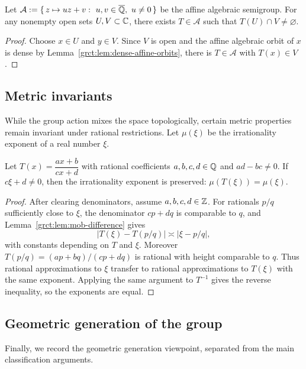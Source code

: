 \begin{corollary}\label{grct:cor:affine-semigroup-transitive}
	Let $\mathcal A:=\{\,z\mapsto uz+v:\ u,v\in\Alg,\ u\ne0\,\}$ be the affine algebraic semigroup. For any nonempty open sets $U,V\subset\mathbb{C}$, there exists $T\in\mathcal A$ such that $T(U)\cap V\neq\varnothing$.
\end{corollary}
\begin{proof}
	Choose $x\in U$ and $y\in V$. Since $V$ is open and the affine algebraic orbit of $x$ is dense by Lemma~\ref{grct:lem:dense-affine-orbits}, there is $T\in\mathcal A$ with $T(x)\in V$.
\end{proof}

\subsection{Metric invariants}

While the group action mixes the space topologically, certain metric properties remain invariant under rational restrictions. Let $\mu(\xi)$ be the irrationality exponent of a real number $\xi$.

\begin{theorem}\label{grct:thm:irr-exp-invariance}
	Let $T(x)=\dfrac{ax+b}{cx+d}$ with rational coefficients $a,b,c,d\in\mathbb{Q}$ and $ad-bc\ne0$. If $c\xi+d\neq 0$, then the irrationality exponent is preserved:
	\(
	\mu(T(\xi))=\mu(\xi).
	\)
\end{theorem}
\begin{proof}
	After clearing denominators, assume $a,b,c,d\in\mathbb{Z}$. For rationals $p/q$ sufficiently close to $\xi$, the denominator $cp+dq$ is comparable to $q$, and Lemma~\ref{grct:lem:mob-difference} gives
	\[
		\left|T(\xi)-T(p/q)\right|
		\asymp
		\left|\xi-p/q\right|,
	\]
	with constants depending on $T$ and $\xi$. Moreover $T(p/q)=(ap+bq)/(cp+dq)$ is rational with height comparable to $q$. Thus rational approximations to $\xi$ transfer to rational approximations to $T(\xi)$ with the same exponent. Applying the same argument to $T^{-1}$ gives the reverse inequality, so the exponents are equal.
\end{proof}

\subsection{Geometric generation of the group}

Finally, we record the geometric generation viewpoint, separated from the main classification arguments.

